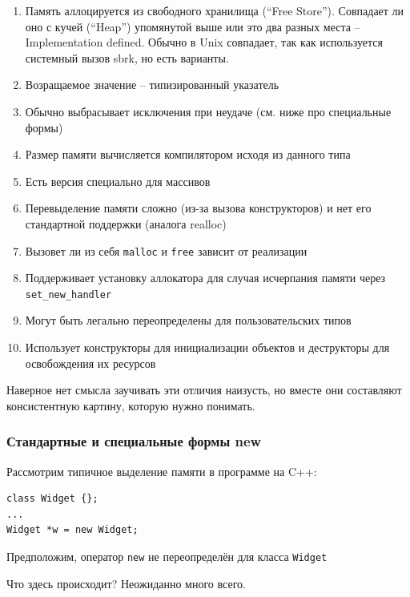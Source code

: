 \documentclass[a4paper,12pt,oneside]{article}
\begin{document}
\begin{enumerate}
\item
Память аллоцируется из свободного хранилища (``Free Store''). Совпадает ли оно с кучей (``Heap'') упомянутой выше или это два разных места -- Implementation defined. Обычно в Unix совпадает, так как используется системный вызов sbrk, но есть варианты.
\item
Возращаемое значение -- типизированный указатель
\item
Обычно выбрасывает исключения при неудаче (см. ниже про специальные формы)
\item
Размер памяти вычисляется компилятором исходя из данного типа
\item
Есть версия специально для массивов
\item
Перевыделение памяти сложно (из-за вызова конструкторов) и нет его стандартной поддержки (аналога realloc)
\item
Вызовет ли из себя \lstinline!malloc! и \lstinline!free! зависит от реализации
\item
Поддерживает установку аллокатора для случая исчерпания памяти через \lstinline!set_new_handler!
\item
Могут быть легально переопределены для пользовательских типов
\item
Использует конструкторы для инициализации объектов и деструкторы для освобождения их ресурсов
\end{enumerate}

Наверное нет смысла заучивать эти отличия наизусть, но вместе они составляют консистентную картину, которую нужно понимать.

\subsubsection{Стандартные и специальные формы new}\label{PlacementNew}

Рассмотрим типичное выделение памяти в программе на C++:

\begin{lstlisting}
class Widget {};
...
Widget *w = new Widget;
\end{lstlisting}

Предположим, оператор \lstinline!new! не переопределён для класса \lstinline!Widget!

Что здесь происходит? Неожиданно много всего.
\end{document}
